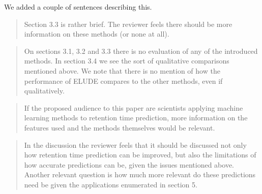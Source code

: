 \documentclass[letterpaper]{article}
\newcommand{\breview}{\begin{quotation}\begin{bf}\noindent}
\newcommand{\ereview}{\end{bf}\end{quotation}}
\begin{document}
We added a couple of sentences describing this.
\breview

Section 3.3 is rather brief. The reviewer feels there should be more information on these methods (or none at all).
\ereview
\breview


On sections 3.1, 3.2 and 3.3 there is no evaluation of any of the introduced methods. In section 3.4 we see the sort of qualitative comparisons mentioned above. We note that there is no mention of how the performance of ELUDE compares to the other methods, even if qualitatively.
\ereview
\breview

If the proposed audience to this paper are scientists applying machine learning methods to retention time prediction, more information on the features used and the methods themselves would be relevant. 
\ereview
\breview

In the discussion the reviewer feels that it should be discussed not only how retention time prediction can be improved, but also the limitations of how accurate predictions can be, given the issues mentioned above. Another relevant question is how much more relevant do these predictions need be given the applications enumerated in section 5.


\ereview
\end{document}
